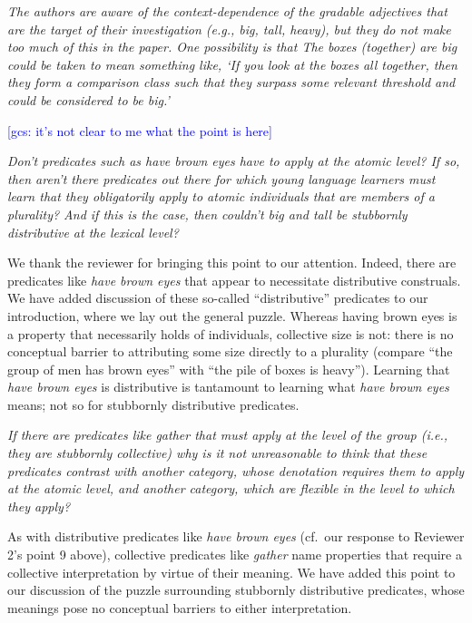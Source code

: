 \documentclass[12pt]{article}
\newcommand{\gcs}[1]{\textcolor{blue}{[gcs: #1]}}
\begin{document}
\item \emph{The authors are aware of the context-dependence of the gradable adjectives that are the target of their investigation (e.g., \emph{big}, \emph{tall}, \emph{heavy}), but they do not make too much of this in the paper. One possibility is that \emph{The boxes (together) are big} could be taken to mean something like, `If you look at the boxes all together, then they form a comparison class such that they surpass some relevant threshold and could be considered to be big.'}

\gcs{it's not clear to me what the point is here}

\item \emph{Don't predicates such as \emph{have brown eyes} have to apply at the atomic level? If so, then aren't there predicates out there for which young language learners must learn that they obligatorily apply to atomic individuals that are members of a plurality? And if this is the case, then couldn't \emph{big} and \emph{tall} be stubbornly distributive at the lexical level?}

We thank the reviewer for bringing this point to our attention. Indeed, there are predicates like \emph{have brown eyes} that appear to necessitate distributive construals. We have added discussion of these so-called ``distributive'' predicates to our introduction, where we lay out the general puzzle. Whereas having brown eyes is a property that necessarily holds of individuals, collective size is not: there is no conceptual barrier to attributing some size directly to a plurality (compare ``the group of men has brown eyes'' with ``the pile of boxes is heavy''). Learning that \emph{have brown eyes} is distributive is tantamount to learning what \emph{have brown eyes} means; not so for stubbornly distributive predicates.

\item \emph{If there are predicates like \emph{gather} that must apply at the level of the group (i.e., they are stubbornly collective) why is it not unreasonable to think that these predicates contrast with another category, whose denotation requires them to apply at the atomic level, and another category, which are flexible in the level to which they apply?}

As with distributive predicates like \emph{have brown eyes} (cf.~our response to Reviewer 2's point 9 above), collective predicates like \emph{gather} name properties that require a collective interpretation by virtue of their meaning. We have added this point to our discussion of the puzzle surrounding stubbornly distributive predicates, whose meanings pose no conceptual barriers to either interpretation.
\end{document}
